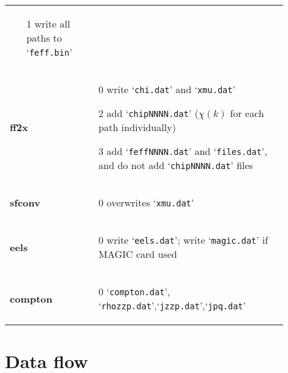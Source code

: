 \documentclass[11pt,oneside]{report} %
\newcommand{\file}[1]{`\texttt{#1}'}
\newcommand{\module}[1]{\textrm{\bf{#1}}}
\begin{document}
\begin{latexonly}
\begin{table}[htbp]
\begin{center}
\begin{tabular}[h]{p{0.1\linewidth}p{0.8\linewidth}}
\begin{itemize}
      \item[1] write all paths to \file{feff.bin}
      \end{itemize}\\
      \module{ff2x} &
      \vspace{-4ex}
      \begin{itemize}
        \tightlist
      \item[0] write \file{chi.dat} and \file{xmu.dat}
      \item[2] add \file{chipNNNN.dat} ($\chi(k)$ for each path individually)
      \item[3] add \file{feffNNNN.dat} and \file{files.dat}, and do not add \file{chipNNNN.dat} files
      \end{itemize}\\
      \module{sfconv} &
      \vspace{-4ex}
      \begin{itemize}
        \tightlist
      \item[0] overwrites \file{xmu.dat}
      \end{itemize}\\
      \module{eels} &
      \vspace{-4ex}
      \begin{itemize}
        \tightlist
      \item[0] write \file{eels.dat}; write \file{magic.dat} if MAGIC card used
      \end{itemize}\\
      \module{compton} &
      \vspace{-4ex}
      \begin{itemize}
        \tightlist
      \item[0] \file{compton.dat}, \file{rhozzp.dat},\file{jzzp.dat},\file{jpq.dat}
      \end{itemize}\\      
      \hline\hline
    \end{tabular}
    \label{tab:printlevels}
    \end{center}
\end{table}

\newpage

\section{Data flow}
\label{sec:File-structure-code}


\end{latexonly}
\end{document}
